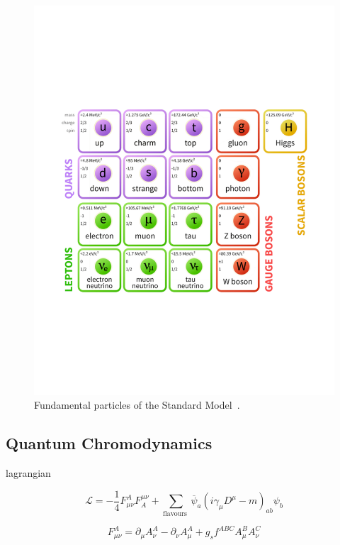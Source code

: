 \begin{figure}[htb]
\centering
\includegraphics[width=1.0\textwidth]{smdiagram.pdf}
\caption{Fundamental particles of the Standard Model~\cite{modellinginvisible}.}
\label{fig:SM}
\end{figure}






\subsection{Quantum Chromodynamics}\label{secSM:ch1}


lagrangian

\begin{equation}
\mathcal{L}=-\frac{1}{4} F_{\mu \nu}^{A} F_{A}^{\mu \nu}+\sum_{\text {flavours }} \overline{\psi}_{a}\left(i \gamma_{\mu} D^{\mu}-m\right)_{a b} \psi_{b}
\end{equation}

\begin{equation}
F_{\mu \nu}^{A}=\partial_{\mu} A_{\nu}^{A}-\partial_{\nu} A_{\mu}^{A}+g_{s} f^{A B C} A_{\mu}^{B} A_{\nu}^{C}
\end{equation}

